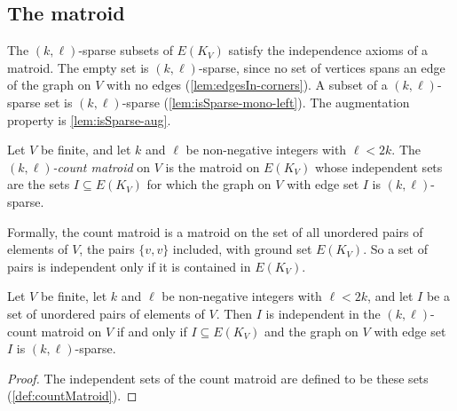 \subsection{The matroid}
\label{sec:count-matroid-def}

The $(k, \ell)$-sparse subsets of $E(K_V)$ satisfy the independence
axioms of a matroid. The empty set is $(k, \ell)$-sparse, since no set
of vertices spans an edge of the graph on $V$ with no edges
(\cref{lem:edgesIn-corners}). A subset of a $(k, \ell)$-sparse set is
$(k, \ell)$-sparse (\cref{lem:isSparse-mono-left}). The augmentation
property is \cref{lem:isSparse-aug}.

\begin{definition}
  \label{def:countMatroid}
  \leanok
  Let $V$ be finite, and let $k$ and $\ell$ be non-negative integers
  with $\ell < 2k$. The \emph{$(k, \ell)$-count matroid} on $V$ is the
  matroid on $E(K_V)$ whose independent sets are the sets
  $I \subseteq E(K_V)$ for which the graph on $V$ with edge set $I$ is
  $(k, \ell)$-sparse.
\end{definition}
\begin{fmlnote}
  Formally, the count matroid is a matroid on the set of all unordered
  pairs of elements of $V$, the pairs $\{v, v\}$ included, with ground
  set $E(K_V)$. So a set of pairs is independent only if it is
  contained in $E(K_V)$.
\end{fmlnote}

\begin{theorem}
  \label{thm:countMatroid-indep-iff}
  \leanok
  Let $V$ be finite, let $k$ and $\ell$ be non-negative integers with
  $\ell < 2k$, and let $I$ be a set of unordered pairs of elements of
  $V$. Then $I$ is independent in the $(k, \ell)$-count matroid on $V$
  if and only if $I \subseteq E(K_V)$ and the graph on $V$ with edge
  set $I$ is $(k, \ell)$-sparse.
\end{theorem}
\begin{proof}
  \leanok
  The independent sets of the count matroid are defined to be these
  sets (\cref{def:countMatroid}).
\end{proof}
